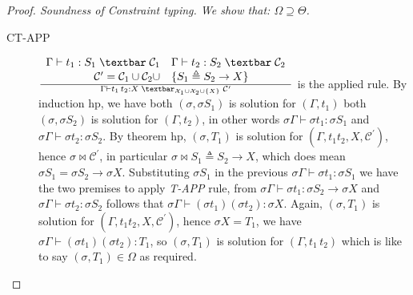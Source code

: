 \documentclass[8pt]{beamer}
\begin{document}
\begin{frame}
\begin{proof}[Proof. Soundness of Constraint typing. We show that: 
        $\Omega \supseteq \Theta$]
\begin{description}
            \item[CT-APP] ${{
                        \begin{array}{rl}
                          \Gamma \vdash t_{1}:S_{1} \; \textbar \;
                            \mathcal{C}_1  &
                        \Gamma \vdash  t_{2}:S_{2} \; \textbar \;
                            \mathcal{C}_2  \\
                         \mathcal{C}^{\prime} = \mathcal{C}_1 \cup 
                            \mathcal{C}_2
                            \cup & \{ S_1 \triangleq S_2 \rightarrow X 
                        \} \end{array}}\over
                        {\Gamma \vdash t_{1} \, t_{2} : X\;
                    \textbar_{\mathcal{X}_1 \cup \mathcal{X}_2 \cup
                        \{X\}} \; \mathcal{C}^{\prime} }}$ is the 
                        applied rule. By induction hp, we have both 
                        $(\sigma, \sigma S_1)$ is solution for 
                        $(\Gamma, t_1)$ both $(\sigma, \sigma S_2)$ is 
                        solution for $(\Gamma, t_2)$, in other words 
                        $\sigma \Gamma \vdash \sigma t_1 : \sigma S_1$ 
                        and $\sigma \Gamma \vdash \sigma t_2 : \sigma 
                        S_2$. By theorem hp, $(\sigma,T_1)$ is 
                        solution for $(\Gamma, t_1 t_2, X, 
                        \mathcal{C}^{\prime})$, hence $\sigma \Join 
                        \mathcal{C}^{\prime}$, in particular $\sigma 
                        \Join S_1\triangleq S_2\rightarrow X$, which 
                        does mean $\sigma S_1 = \sigma S_2 \rightarrow 
                        \sigma X$. Substituting $\sigma S_1$ in the 
                        previous $\sigma \Gamma \vdash \sigma t_1 : 
                        \sigma S_1$ we have the two premises to apply 
                        \emph{T-APP} rule, from $\sigma\Gamma \vdash
                        \sigma t_1:\sigma S_2 \rightarrow \sigma X$ 
                        and $\sigma \Gamma \vdash \sigma t_2 :\sigma 
                        S_2$ follows that $\sigma \Gamma \vdash 
                        (\sigma t_1) (\sigma t_2) : \sigma X$. Again, 
                        $(\sigma,T_1)$ is solution for $(\Gamma, t_1 
                        t_2, X, \mathcal{C}^{\prime})$, hence $\sigma 
                        X = T_1$, we have $\sigma \Gamma \vdash 
                        (\sigma t_1) (\sigma t_2) : T_1$, so $(\sigma, 
                        T_1)$ is solution for $(\Gamma, t_1 \, t_2)$
                        which is like to say $(\sigma, T_1)\in\Omega$ 
                        as required.
                
        \end{description}
    \end{proof}
    \normalsize
\end{frame}
\end{document}
